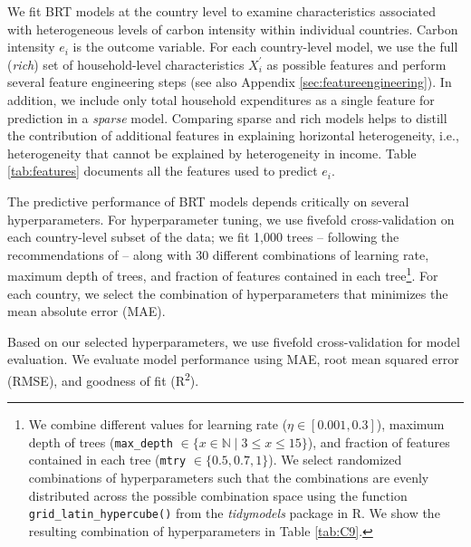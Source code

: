 \documentclass[12pt, a4paper]{article}
\begin{document}
We fit BRT models at the country level to examine characteristics associated with heterogeneous levels of carbon intensity within individual countries. Carbon intensity $e_{i}$ is the outcome variable. For each country-level model, we use the full (\textit{rich}) set of household-level characteristics $X_{i}^{'}$ as possible features and perform several feature engineering steps (see also Appendix \ref{sec:featureengineering}). In addition, we include only total household expenditures as a single feature for prediction in a \textit{sparse} model. Comparing sparse and rich models helps to distill the contribution of additional features in explaining horizontal heterogeneity, i.e., heterogeneity that cannot be explained by heterogeneity in income. Table \ref{tab:features} documents all the features used to predict $e_{i}$.



The predictive performance of BRT models depends critically on several hyperparameters. For hyperparameter tuning, we use fivefold cross-validation on each country-level subset of the data; we fit 1,000 trees -- following the recommendations of \textcite{Elith.2008} -- along with 30 different combinations of learning rate, maximum depth of trees, and fraction of features contained in each tree\footnote{We combine different values for learning rate ($\eta \in [0.001,0.3]$), maximum depth of trees (\texttt{max\_depth} $\in \{x \in \mathbb{N} \mid 3  \leq x \leq 15 \}$), and fraction of features contained in each tree (\texttt{mtry} $\in \{0.5,0.7,1\}$). We select randomized combinations of hyperparameters such that the combinations are evenly distributed across the possible combination space using the function \texttt{grid\_latin\_hypercube()} from the \textit{tidymodels} package in R. We show the resulting combination of hyperparameters in Table \ref{tab:C9}.}. For each country, we select the combination of hyperparameters that minimizes the mean absolute error (MAE).

Based on our selected hyperparameters, we use fivefold cross-validation for model evaluation. We evaluate model performance using MAE, root mean squared error (RMSE), and goodness of fit (R\textsuperscript{2}). 
\end{document}
